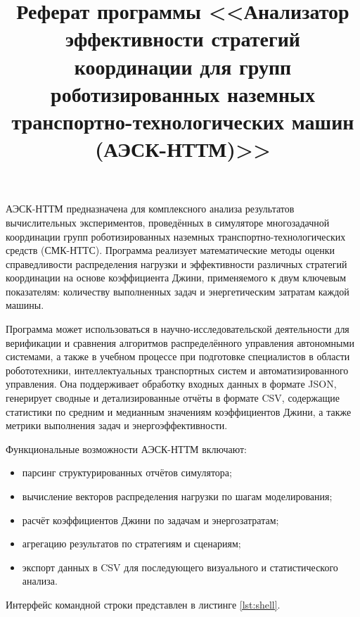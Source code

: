 

\title{Реферат программы <<Анализатор эффективности стратегий координации для групп роботизированных наземных транспортно-технологических машин (АЭСК-НТТМ)>>}



\maketitle

АЭСК-НТТМ предназначена для комплексного анализа результатов вычислительных экспериментов, проведённых в симуляторе многозадачной координации групп роботизированных наземных транспортно-технологических средств (СМК-НТТС). Программа реализует математические методы оценки справедливости распределения нагрузки и эффективности различных стратегий координации на основе коэффициента Джини, применяемого к двум ключевым показателям: количеству выполненных задач и энергетическим затратам каждой машины.

Программа может использоваться в научно-исследовательской деятельности для верификации и сравнения алгоритмов распределённого управления автономными системами, а также в учебном процессе при подготовке специалистов в области робототехники, интеллектуальных транспортных систем и автоматизированного управления. Она поддерживает обработку входных данных в формате JSON, генерирует сводные и детализированные отчёты в формате CSV, содержащие статистики по средним и медианным значениям коэффициентов Джини, а также метрики выполнения задач и энергоэффективности.

Функциональные возможности АЭСК-НТТМ включают:
\begin{itemize}
\item парсинг структурированных отчётов симулятора;
\item вычисление векторов распределения нагрузки по шагам моделирования;
\item расчёт коэффициентов Джини по задачам и энергозатратам;
\item агрегацию результатов по стратегиям и сценариям;
\item экспорт данных в CSV для последующего визуального и статистического анализа.
\end{itemize}

Интерфейс командной строки представлен в листинге \ref{lst:shell}.

